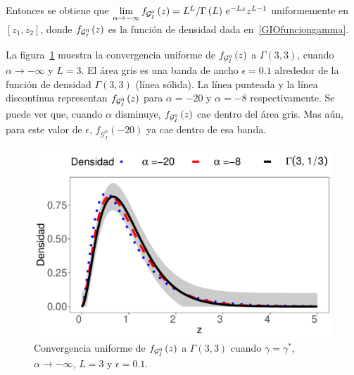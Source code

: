 \begin{dem}
	Entonces se obtiene que $\lim\limits_{\alpha\to-\infty}f_{\mathcal{G}_I^0}\left( z \right) = L^{L}/\Gamma\left( L \right)\,\mathrm{e}^{-Lz}z^{L-1}$ uniformemente en $[z_{1},z_{2}]$, donde $f_{\mathcal{G}_I^0}\left( z \right)$ es la función de densidad dada en~\eqref{GIOfunciongamma}.
\end{dem}

La figura~\ref{ConvInfinito} muestra la convergencia uniforme de $f_{\mathcal{G}_I^0}\left( z \right)$ a $\Gamma(3,3)$, cuando $\alpha \to -\infty$ y $L=3$. 
El área gris es una banda de ancho $\epsilon=0.1$ alrededor de la función de densidad $\Gamma(3,3)$ (línea sólida). 
La línea punteada y la línea discontinua representan $f_{\mathcal{G}_I^0}\left( z \right)$ para $\alpha=-20$ y $\alpha=-8$ respectivamente. 
Se puede ver que, cuando $\alpha$ disminuye, $f_{\mathcal{G}_I^0}\left( z \right)$ cae dentro del área gris. 
Mas aún, para este valor de $\epsilon$, $f_{\mathcal{G}_I^0}(-20)$ ya cae dentro de esa banda.


\begin{figure}[hbt]
\begin{center}
	\includegraphics[scale=0.8]{../../Figures/Tesis/Capitulo4/ConvUniformeMenosInfinito2.pdf}
	\caption{\label{ConvInfinito}\small{Convergencia uniforme de $f_{\mathcal{G}_I^0}\left( z \right)$ a $\Gamma(3,3)$ cuando $\gamma=\gamma^*$, $\alpha \to -\infty$, $L=3$ y $\epsilon=0.1$.}}
\end{center}
\end{figure} 


